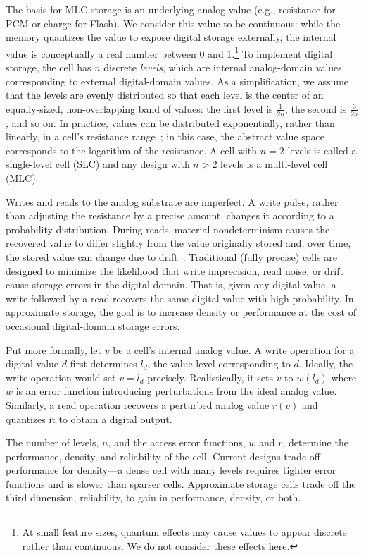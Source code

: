 The basis for MLC storage is an underlying analog value (e.g., resistance for
PCM or charge for Flash).
We consider this value to be
continuous: while the memory quantizes the value to expose digital
storage externally, the internal value is conceptually
a real number between 0 and 1.\footnote{At small feature sizes, quantum effects may
cause values to appear discrete rather than
continuous. We do not consider these effects here.}
To implement
digital storage, the cell has $n$ discrete \emph{levels}, which are
internal analog-domain values corresponding to
external digital-domain values. As a simplification, we
assume that the levels are evenly distributed so that each level is
the center of an equally-sized, non-overlapping band of values: the
first level is $\frac{1}{2n}$, the second is $\frac{3}{2n}$, and so
on. In practice, values can be distributed exponentially, rather
    than linearly, in a cell's resistance range~\cite{mlcibm,partialreset}; in this case, the abstract value space corresponds
to the logarithm of the resistance. A cell with $n=2$ levels is
called a single-level cell (SLC) and any design with $n
> 2$ levels is a multi-level cell (MLC).

Writes and reads to the analog substrate are imperfect. A write
pulse, rather than adjusting the resistance by a precise amount,
changes it according to a probability distribution. During
reads, material nondeterminism causes the recovered value to differ
slightly from the value originally stored and, over time, the stored
value can change due to drift~\cite{wdddmlcpcm}.
Traditional (fully precise) cells are designed to minimize the
likelihood that write imprecision, read noise, or drift cause storage
errors in the digital domain. That is, given any digital value, a
write followed by a read recovers the same digital value with
high probability. In approximate storage, the goal is to increase
density or performance at the cost of occasional digital-domain
storage errors.

Put more formally, let $v$ be a cell's internal analog value. A
write operation for a digital value $d$ first determines
$l_d$, the value level corresponding to
$d$. Ideally, the write operation would set $v = l_d$ precisely.
Realistically, it sets $v$ to $w(l_d)$ where $w$ is an error
function introducing perturbations from the ideal analog value.
Similarly, a read operation recovers a perturbed analog value $r(v)$ and
quantizes it to obtain a digital output.

The number of levels, $n$, and the access error functions, $w$ and
$r$, determine the performance, density, and reliability of the cell.
Current designs trade off performance
for density---a dense cell with many levels requires tighter error
functions and is slower than sparser cells. Approximate
storage cells trade off the third dimension, reliability, to gain in
performance, density, or both.

